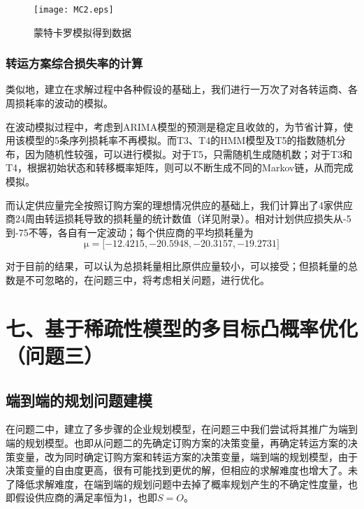 \documentclass{my_paper}
\begin{document}
\begin{figure}[h]
\texttt{[image: MC2.eps]}
\caption{蒙特卡罗模拟得到数据}\label{MC2}
\end{figure}

\subsubsection{转运方案综合损失率的计算}
类似地，建立在求解过程中各种假设的基础上，我们进行一万次了对各转运商、各周损耗率的波动的模拟。

在波动模拟过程中，考虑到ARIMA模型的预测是稳定且收敛的，为节省计算，使用该模型的5条序列损耗率不再模拟。而T3、T4的HMM模型及T5的指数随机分布，因为随机性较强，可以进行模拟。对于T5，只需随机生成随机数；对于T3和T4，根据初始状态和转移概率矩阵，则可以不断生成不同的Markov链，从而完成模拟。

而认定供应量完全按照订购方案的理想情况供应的基础上，我们计算出了4家供应商24周由转运损耗导致的损耗量的统计数值（详见附录）。相对计划供应损失从-5到-75不等，各自有一定波动；每个供应商的平均损耗量为
$$ \mathrm{\mu} = \lbrack -12.4215,  -20.5948,  -20.3157, -19.2731\rbrack $$

对于目前的结果，可以认为总损耗量相比原供应量较小，可以接受；但损耗量的总数是不可忽略的，在问题三中，将考虑相关问题，进行优化。

\section{七、基于稀疏性模型的多目标凸概率优化（问题三）}

\subsection{端到端的规划问题建模}

在问题二中，建立了多步骤的企业规划模型，在问题三中我们尝试将其推广为端到端的规划模型。也即从问题二的先确定订购方案的决策变量，再确定转运方案的决策变量，改为同时确定订购方案和转运方案的决策变量，端到端的规划模型，由于决策变量的自由度更高，很有可能找到更优的解，但相应的求解难度也增大了。未了降低求解难度，在端到端的规划问题中去掉了概率规划产生的不确定性度量，也即假设供应商的满足率恒为1，也即$S=O$。
\end{document}
